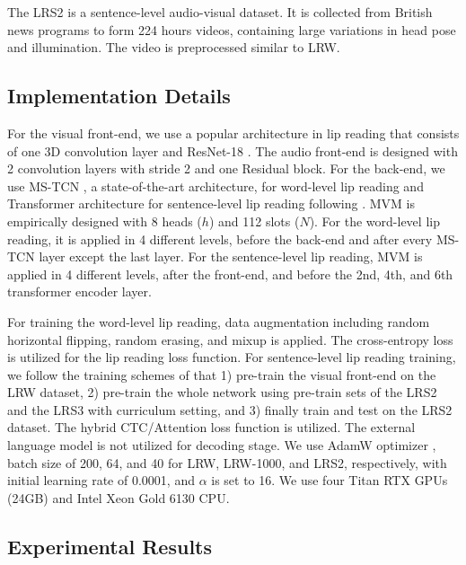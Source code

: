 \documentclass[letterpaper]{article} \usepackage{aaai22}  \usepackage{times}  \usepackage{helvet}  \usepackage{courier}  \usepackage[hyphens]{url}  \usepackage{graphicx} \urlstyle{rm} \def\UrlFont{\rm}  \usepackage{natbib}  \usepackage{caption} \DeclareCaptionStyle{ruled}{labelfont=normalfont,labelsep=colon,strut=off} \frenchspacing  \setlength{\pdfpagewidth}{8.5in}  \setlength{\pdfpageheight}{11in}  \usepackage{algorithm}
\begin{document}
The LRS2 is a sentence-level audio-visual dataset. It is collected from British news programs to form 224 hours videos, containing large variations in head pose and illumination. The video is preprocessed similar to LRW.

\subsection{Implementation Details}
For the visual front-end, we use a popular architecture in lip reading that consists of one 3D convolution layer and ResNet-18 \cite{petridis2017resnetlstm}. The audio front-end is designed with 2 convolution layers with stride 2 and one Residual block. For the back-end, we use MS-TCN \cite{martinez2020mstcn}, a state-of-the-art architecture, for word-level lip reading and Transformer \cite{vaswani2017attention} architecture for sentence-level lip reading following \cite{afouras2018deep}. MVM is empirically designed with 8 heads ($h$) and 112 slots ($N$). For the word-level lip reading, it is applied in 4 different levels, before the back-end and after every MS-TCN layer except the last layer. For the sentence-level lip reading, MVM is applied in 4 different levels, after the front-end, and before the 2nd, 4th, and 6th transformer encoder layer.

For training the word-level lip reading, data augmentation including random horizontal flipping, random erasing, and mixup \cite{zhang2017mixup, ma2021bornagain} is applied. The cross-entropy loss is utilized for the lip reading loss function. For sentence-level lip reading training, we follow the training schemes of \cite{zhang2019spatio, chung2017lrs2, afouras2018deep} that 1) pre-train the visual front-end on the LRW dataset, 2) pre-train the whole network using pre-train sets of the LRS2 and the LRS3 with curriculum setting, and 3) finally train and test on the LRS2 dataset. The hybrid CTC/Attention \cite{watanabe2017hybrid} loss function is utilized. The external language model is not utilized for decoding stage. We use AdamW optimizer \cite{loshchilov2017adamw}, batch size of 200, 64, and 40 for LRW, LRW-1000, and LRS2, respectively, with initial learning rate of 0.0001, and $\alpha$ is set to 16. We use four Titan RTX GPUs (24GB) and Intel Xeon Gold 6130 CPU.

\subsection{Experimental Results}
\end{document}
